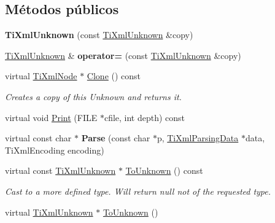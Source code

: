\subsection*{Métodos públicos}
\begin{DoxyCompactItemize}
\item 
\hypertarget{class_ti_xml_unknown_abe798ff4feea31474850c7f0de6bdf5e}{{\bfseries Ti\-Xml\-Unknown} (const \hyperlink{class_ti_xml_unknown}{Ti\-Xml\-Unknown} \&copy)}\label{class_ti_xml_unknown_abe798ff4feea31474850c7f0de6bdf5e}

\item 
\hypertarget{class_ti_xml_unknown_a60560b5aacb4bdc8b2b5f02f0a99c5c0}{\hyperlink{class_ti_xml_unknown}{Ti\-Xml\-Unknown} \& {\bfseries operator=} (const \hyperlink{class_ti_xml_unknown}{Ti\-Xml\-Unknown} \&copy)}\label{class_ti_xml_unknown_a60560b5aacb4bdc8b2b5f02f0a99c5c0}

\item 
\hypertarget{class_ti_xml_unknown_a675c4b2684af35e4c7649b7fd5ae598d}{virtual \hyperlink{class_ti_xml_node}{Ti\-Xml\-Node} $\ast$ \hyperlink{class_ti_xml_unknown_a675c4b2684af35e4c7649b7fd5ae598d}{Clone} () const }\label{class_ti_xml_unknown_a675c4b2684af35e4c7649b7fd5ae598d}

\begin{DoxyCompactList}\small\item\em Creates a copy of this Unknown and returns it. \end{DoxyCompactList}\item 
virtual void \hyperlink{class_ti_xml_unknown_a025f19c21ef01ea9be50febb8fe0ba06}{Print} (F\-I\-L\-E $\ast$cfile, int depth) const 
\item 
\hypertarget{class_ti_xml_unknown_aa51c2694e4177b5f0b5429ee5a81b58d}{virtual const char $\ast$ {\bfseries Parse} (const char $\ast$p, \hyperlink{class_ti_xml_parsing_data}{Ti\-Xml\-Parsing\-Data} $\ast$data, Ti\-Xml\-Encoding encoding)}\label{class_ti_xml_unknown_aa51c2694e4177b5f0b5429ee5a81b58d}

\item 
\hypertarget{class_ti_xml_unknown_ab0313e5fe77987d746ac1a97a254419d}{virtual const \hyperlink{class_ti_xml_unknown}{Ti\-Xml\-Unknown} $\ast$ \hyperlink{class_ti_xml_unknown_ab0313e5fe77987d746ac1a97a254419d}{To\-Unknown} () const }\label{class_ti_xml_unknown_ab0313e5fe77987d746ac1a97a254419d}

\begin{DoxyCompactList}\small\item\em Cast to a more defined type. Will return null not of the requested type. \end{DoxyCompactList}\item 
\hypertarget{class_ti_xml_unknown_a67c9fd22940e8c47f706a72cdd2e332c}{virtual \hyperlink{class_ti_xml_unknown}{Ti\-Xml\-Unknown} $\ast$ \hyperlink{class_ti_xml_unknown_a67c9fd22940e8c47f706a72cdd2e332c}{To\-Unknown} ()}\label{class_ti_xml_unknown_a67c9fd22940e8c47f706a72cdd2e332c}


\end{DoxyCompactItemize}
